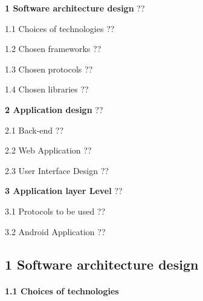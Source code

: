 \documentclass{article}
\begin{document}
\textbf{1  Software architecture design }??

    1.1  Choices of technologies ??

    1.2  Chosen frameworks ??

    1.3  Chosen protocols ??

    1.4  Chosen libraries ??



\textbf{2  Application design }??

    2.1  Back-end ??

    2.2  Web Application ??

    2.3  User Interface Design ??







\textbf{3  Application layer Level }??

    3.1  Protocols to be used ??

    3.2  Android Application ??



















































 

\noindent 
\subsection{1  Software architecture design}

 


\paragraph{1.1  Choices of technologies}
\end{document}
